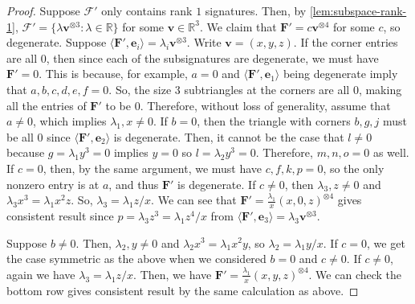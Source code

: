 \documentclass[11pt]{article}
\newcommand{\teh}{^{\otimes 3}}
\begin{document}
\begin{proof}
Suppose $\mathscr{F}'$ only contains rank $1$ signatures.
Then, by \cref{lem:subspace-rank-1}, $\mathscr{F}' = \{\lambda \mathbf{v}\teh : \lambda \in \mathbb{R}\}$ for some $\mathbf{v} \in \mathbb{R}^3$.
We claim that $\mathbf{F}' = c \mathbf{v}^{\otimes 4}$ for some $c$, so degenerate.
Suppose $\langle \mathbf{F}', \mathbf{e}_i \rangle = \lambda_i \mathbf{v} \teh$.
Write $\mathbf{v} = (x, y, z)$.
If the corner entries are all $0$, then since each of the subsignatures are degenerate, we must have $\mathbf{F}' = 0$.
This is because, for example, $a = 0$ and $\langle \mathbf{F}', \mathbf{e}_1 \rangle$ being degenerate imply that $a, b, c, d, e, f = 0$.
So, the size $3$ subtriangles at the corners are all $0$, making all the entries of $\mathbf{F}'$ to be $0$.
Therefore, without loss of generality, assume that $a \ne 0$, which implies $\lambda_1, x \ne 0$.
If $b = 0$, then the triangle with corners $b, g, j$ must be all $0$ since $\langle \mathbf{F}', \mathbf{e}_2 \rangle$ is degenerate.
Then, it cannot be the case that $l \ne 0$ because $g = \lambda_1 y^3 = 0$ implies $y = 0$ so $l = \lambda_2 y^3 = 0$.
Therefore, $m, n, o = 0$ as well.
If $c = 0$, then, by the same argument, we must have $c, f, k, p = 0$, so the only nonzero entry is at $a$, and thus $\mathbf{F}'$ is degenerate.
If $c \ne 0$, then $\lambda_3, z \ne 0$ and $\lambda_3 x^3 = \lambda_1 x^2 z$.
So, $\lambda_3 = \lambda_1 z/x$.
We can see that $\mathbf{F}' = \frac{\lambda_1}{x} (x,0, z)^{\otimes 4}$ gives consistent result since $p = \lambda_3 z^3 = \lambda_1 z^4/x$ from $\langle \mathbf{F}', \mathbf{e}_3 \rangle = \lambda_3 \mathbf{v}\teh$.

Suppose $b \ne 0$.
Then, $\lambda_2, y \ne 0$ and $\lambda_2 x^3 = \lambda_1 x^2 y$, so $\lambda_2 = \lambda_1 y/x$.
If $c = 0$, we get the case symmetric as the above when we considered $b = 0$ and $c \ne 0$.
If $c \ne 0$, again we have $\lambda_3 = \lambda_1 z/x$.
Then, we have $\mathbf{F}' = \frac{\lambda_1}{x}(x, y, z)^{\otimes 4}$.
We can check the bottom row gives consistent result by the same calculation as above.
\end{proof}
\end{document}
